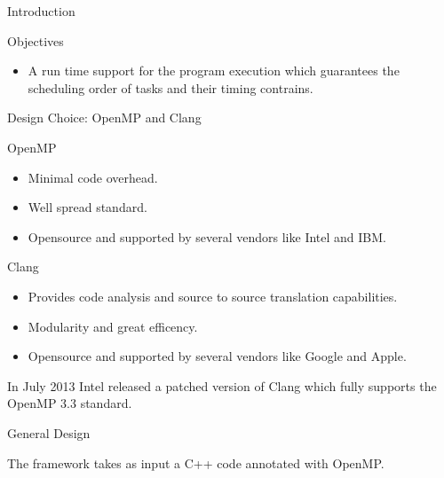 \documentclass[xcolor=dvipsnames]{beamer}
\begin{document}
\begin{section}{Introduction}
\begin{frame}{\hskip 0.3cm Objectives}
\begin{itemize}
\item A run time support for the program execution which guarantees the scheduling order of tasks and their timing contrains.

\end{itemize}



\end{frame}











\begin{frame}{\hskip 0.3cm Design Choice: OpenMP and Clang}


OpenMP 

\begin{itemize}

\item Minimal code overhead.

\item Well spread standard.

\item Opensource and supported by several vendors like Intel and IBM.

\end{itemize}

Clang

\begin{itemize}

\item Provides code analysis and source to source translation capabilities.

\item Modularity and great efficency.

\item Opensource and supported by several vendors like Google and Apple.

\end{itemize}
In July 2013 Intel released a patched version of Clang which fully supports the OpenMP 3.3 standard. 

\end{frame}











\begin{frame}{\hskip 0.3cm General Design}

The framework takes as input a C++ code annotated with OpenMP.


\end{frame}
\end{section}
\end{document}
